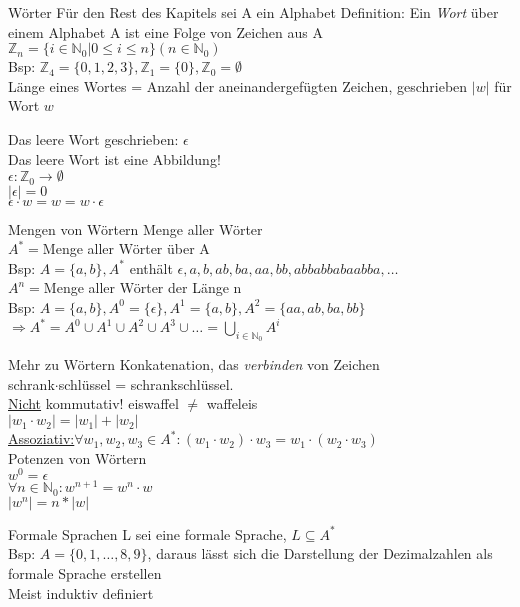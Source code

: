 \begin{frame}{Wörter}
 Für den Rest des Kapitels sei A ein Alphabet
 Definition: Ein \emph{Wort} über einem Alphabet A ist eine Folge von Zeichen aus A\\
 $\mathbb{Z}_{n}=\{i\in\mathbb{N}_{0}\vert0\leq i\leq n\} (n\in\mathbb{N}_{0})$\\
 Bsp: $\mathbb{Z}_{4} =\{0,1,2,3\},\mathbb{Z}_{1}=\{0\},\mathbb{Z}_{0}=\emptyset$\\
 Länge eines Wortes = Anzahl der aneinandergefügten Zeichen, geschrieben $\lvert w\rvert$ für Wort $w$\\
\end{frame}

\begin{frame}{Das leere Wort}
 geschrieben: $\epsilon$\\
 Das leere Wort ist eine Abbildung!\\
 $\epsilon :\mathbb{Z}_{0}\longrightarrow\emptyset$\\
 $\lvert\epsilon\rvert = 0$\\
 $\epsilon\cdot w = w = w\cdot\epsilon$\\
\end{frame}

\begin{frame}{Mengen von Wörtern}
 Menge aller Wörter\\
 $A^{\ast}=$Menge aller Wörter über A\\
 Bsp: $A = \{a, b\}, A^{\ast}$ enthält $\epsilon, a, b, ab, ba, aa, bb, abbabbabaabba,\dots$\\
 $A^{n}=$Menge aller Wörter der Länge n\\
 Bsp: $A=\{a,b\}, A^{0}=\{\epsilon\},A^{1}=\{a,b\},A^{2}=\{aa,ab,ba,bb\}$\\
 $\Rightarrow A^{\ast}=A^{0}\cup A^{1}\cup A^{2}\cup A^{3}\cup\dots = \bigcup\limits_{i\in\mathbb{N}_0}A^{i}$\\%
\end{frame}

\begin{frame}{Mehr zu Wörtern}
 Konkatenation, das \emph{verbinden} von Zeichen\\
 schrank$\cdot$schlüssel = schrankschlüssel.\\
 \underline{Nicht} kommutativ! eiswaffel $\neq$ waffeleis\\
 $\lvert w_{1}\cdot w_{2}\rvert =\lvert w_{1}\rvert + \lvert w_{2}\rvert$\\
 \underline{Assoziativ:}$\forall w_{1},w_{2},w_{3}\in A^{\ast}:(w_{1}\cdot w_{2})\cdot w_{3} = w_{1}\cdot (w_{2}\cdot w_{3})$\\
 Potenzen von Wörtern\\
 $w^{0}=\epsilon$\\
 $\forall n\in\mathbb{N}_{0}:w^{n+1}=w^{n}\cdot w$\\
 $\lvert w^{n}\rvert = n\ast \lvert w\rvert$\\
\end{frame}

\begin{frame}{Formale Sprachen}
 L sei eine formale Sprache, $L\subseteq A^{\ast}$\\
 Bsp: $A =\{0,1,\dots ,8,9\}$, daraus lässt sich die Darstellung der Dezimalzahlen als formale Sprache erstellen\\
 Meist induktiv definiert\\
\end{frame}

